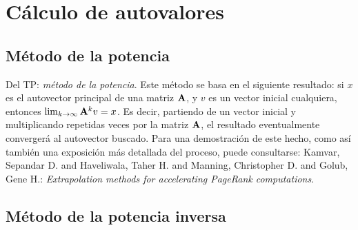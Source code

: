 
\section{Cálculo de autovalores}
\subsection{Método de la potencia}

Del TP:
\emph{método de la potencia}. Este método se basa en el siguiente resultado:
si $x$ es el autovector principal de una matriz $\mathbf{A}$, y $v$ es un vector
inicial cualquiera, entonces $\lim_{k\to\infty}\mathbf{A}^k v = x$. Es decir,
partiendo de un vector inicial y multiplicando repetidas veces por la matriz
$\mathbf{A}$, el resultado eventualmente convergerá al autovector buscado. Para
una demostración de este hecho, como así también una exposición más detallada
del proceso, puede consultarse: Kamvar, Sepandar D. and Haveliwala, Taher H.
and Manning, Christopher D. and Golub, Gene H.: \emph{Extrapolation
methods for accelerating PageRank computations}.

\subsection{Método de la potencia inversa}
